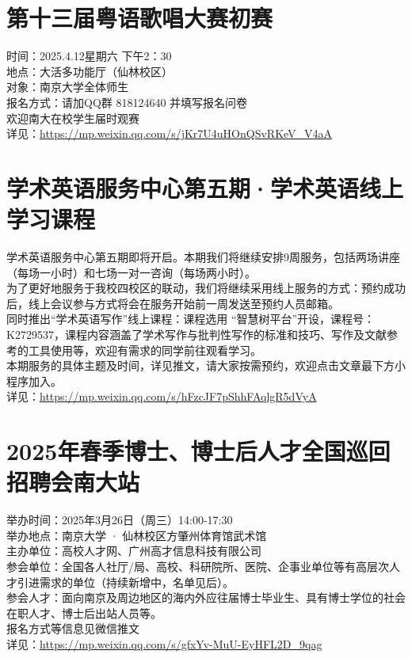 \documentclass[letterpaper, 12pt]{article}
\begin{document}
\begin{multicols}{2}
\section{第十三届粤语歌唱大赛初赛}
时间：2025.4.12星期六 下午2：30
\\地点：大活多功能厅（仙林校区）
\\对象：南京大学全体师生
\\报名方式：请加QQ群 818124640 并填写报名问卷
\\欢迎南大在校学生届时观赛
\\详见：\url{https://mp.weixin.qq.com/s/jKr7U4uHOnQSvRKeV_V4aA}

\section{学术英语服务中心第五期·学术英语线上学习课程}
学术英语服务中心第五期即将开启。本期我们将继续安排9周服务，包括两场讲座（每场一小时）和七场一对一咨询（每场两小时）。
\\为了更好地服务于我校四校区的联动，我们将继续采用线上服务的方式：预约成功后，线上会议参与方式将会在服务开始前一周发送至预约人员邮箱。
\\同时推出“学术英语写作”线上课程：课程选用 “智慧树平台”开设，课程号：K2729537，课程内容涵盖了学术写作与批判性写作的标准和技巧、写作及文献参考的工具使用等，欢迎有需求的同学前往观看学习。
\\本期服务的具体主题及时间，详见推文，请大家按需预约，欢迎点击文章最下方小程序加入。
\\详见：\url{https://mp.weixin.qq.com/s/hFzcJF7pShhFAqlgR5dVyA}


\section{2025年春季博士、博士后人才全国巡回招聘会南大站}
举办时间：2025年3月26日（周三）14:00-17:30
\\举办地点：南京大学 · 仙林校区方肇州体育馆武术馆
\\主办单位：高校人才网、广州高才信息科技有限公司
\\参会单位：全国各人社厅/局、高校、科研院所、医院、企事业单位等有高层次人才引进需求的单位（持续新增中，名单见后）。
\\参会人才：面向南京及周边地区的海内外应往届博士毕业生、具有博士学位的社会在职人才、博士后出站人员等。
\\报名方式等信息见微信推文
\\详见：\url{https://mp.weixin.qq.com/s/gfxYv-MuU-EyHFL2D_9qag}


\end{multicols}
\end{document}
